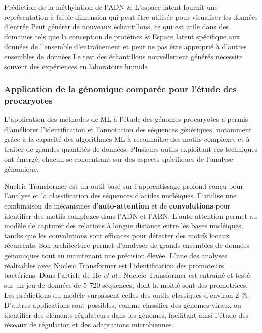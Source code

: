 \begin{table}[htbp]
\begin{sideways}
\begin{tabular}
    Prédiction de la méthylation de l'ADN & L'espace latent fournit une représentation à faible dimension qui peut être utilisée pour visualiser les données d'entrée \newline Peut générer de nouveaux échantillons, ce qui est utile dans des domaines tels que la conception de protéines & Espace latent spécifique aux données de l'ensemble d'entraînement et peut ne pas être approprié à d'autres ensembles de données \newline Le test des échantillons nouvellement générés nécessite souvent des expériences en laboratoire humide \\
    \hline
    \end{tabular}
   \end{sideways}
    \caption[Méthode de deep learning]{\textbf{Méthodes de Deep Learning.} Extrait et adapté de \cite{greener_guide_2022}}
    \label{tab:dl_met}
\end{table}

\newpage

\subsubsection{Application de la génomique comparée pour l'étude des procaryotes}

L'application des méthodes de ML à l'étude des génomes procaryotes a permis d'améliorer l'identification et l'annotation des séquences génétiques, notamment grâce à la capacité des algorithmes ML à reconnaître des motifs complexes et à traiter de grandes quantités de données. Plusieurs outils exploitant ces techniques ont émergé, chacun se concentrant sur des aspects spécifiques de l'analyse génomique.

Nucleic Transformer \cite{he_nucleic_2023} est un outil basé sur l'apprentissage profond conçu pour l'analyse et la classification des séquences d'acides nucléiques. Il utilise une combinaison de mécanismes d'\textbf{auto-attention} et de \textbf{convolutions} pour identifier des motifs complexes dans l'ADN et l'ARN. L’auto-attention permet au modèle de capturer des relations à longue distance entre les bases nucléiques, tandis que les convolutions sont efficaces pour détecter des motifs locaux récurrents. Son architecture permet d'analyser de grands ensembles de données génomiques tout en maintenant une précision élevée. L’une des analyses réalisables avec Nucleic Transformer est l'identification des promoteurs bactériens. Dans l'article de He \textit{et al.}, Nucleic Transformer est entraîné et testé sur un jeu de données de 5 720 séquences, dont la moitié sont des promotrices. Les prédictions du modèle surpassent celles des outils classiques d'environ 2 \%. D'autres applications sont possibles, comme classifier des génomes viraux ou identifier des éléments régulateurs dans les génomes, facilitant ainsi l'étude des réseaux de régulation et des adaptations microbiennes.

